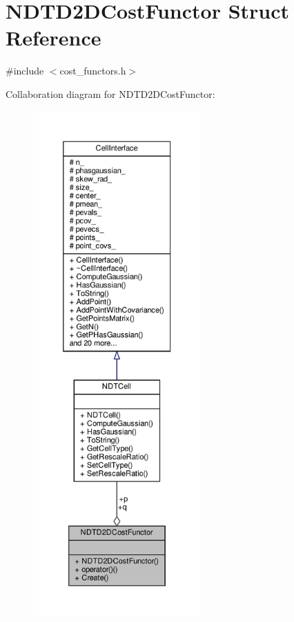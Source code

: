 \hypertarget{structNDTD2DCostFunctor}{}\section{N\+D\+T\+D2\+D\+Cost\+Functor Struct Reference}
\label{structNDTD2DCostFunctor}


{\ttfamily \#include $<$cost\+\_\+functors.\+h$>$}



Collaboration diagram for N\+D\+T\+D2\+D\+Cost\+Functor\+:\nopagebreak
\begin{figure}[H]
\begin{center}
\leavevmode
\includegraphics[height=550pt]{db/db3/structNDTD2DCostFunctor__coll__graph}
\end{center}
\end{figure}
